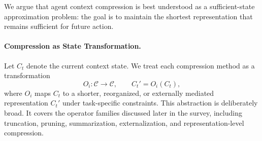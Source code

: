 
We argue that agent context compression is best understood as a sufficient-state approximation problem: the goal is to maintain the shortest representation that remains sufficient for future action.

\paragraph{Compression as State Transformation.} Let \(C_t\) denote the current context state. We treat each compression method as a transformation
{\setlength{\abovedisplayskip}{4pt}
\setlength{\belowdisplayskip}{4pt}
\setlength{\abovedisplayshortskip}{2pt}
\setlength{\belowdisplayshortskip}{2pt}
\[
O_i : \mathcal{C} \rightarrow \mathcal{C}, \qquad C_t' = O_i(C_t),
\]
}
where \(O_i\) maps \(C_t\) to a shorter, reorganized, or externally mediated representation \(C_t'\) under task-specific constraints. This abstraction is deliberately broad. It covers the operator families discussed later in the survey, including truncation, pruning, summarization, externalization, and representation-level compression.


